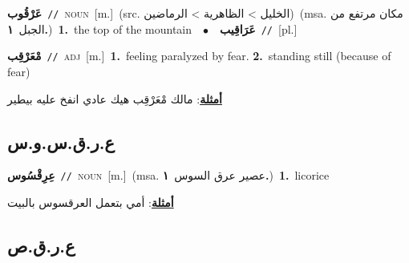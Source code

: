 \documentclass[10pt,a4paper,twoside]{article} %
\begin{document}
\begin{multicols}{2}
{\setlength\topsep{0pt}\textbf{\foreignlanguage{arabic}{عَرْقُوب}}\ {\color{gray}\texttt{//}\color{black}}\ \textsc{noun}\ [m.]\ (src. \color{gray}\foreignlanguage{arabic}{الخليل > الظاهرية > الرماضين}\color{black})\ \color{gray}(msa. \foreignlanguage{arabic}{مكان مرتفع من الجبل}~\foreignlanguage{arabic}{\textbf{١.}})\color{black}\ \textbf{1.}~the top of the mountain\ \ $\bullet$\ \ \setlength\topsep{0pt}\textbf{\foreignlanguage{arabic}{عَرَاقِيب}}\ {\color{gray}\texttt{//}\color{black}}\ [pl.]\ } \vspace{2mm}

{\setlength\topsep{0pt}\textbf{\foreignlanguage{arabic}{مْعَرْقِب}}\ {\color{gray}\texttt{//}\color{black}}\ \textsc{adj}\ [m.]\ \textbf{1.}~feeling paralyzed by fear.  \textbf{2.}~standing still (because of fear)\  \begin{flushright}\color{gray}\foreignlanguage{arabic}{\textbf{\underline{\foreignlanguage{arabic}{أمثلة}}}: مالك مْعَرْقِب هيك عادي انفخ عليه بيطير}\end{flushright}\color{black}} \vspace{2mm}

\vspace{-3mm}
\subsection*{\color{blue}\foreignlanguage{arabic}{ع.ر.ق.س.و.س}\color{blue}{ (ntws)}} 

{\setlength\topsep{0pt}\textbf{\foreignlanguage{arabic}{عِرِقْسُوس}}\ {\color{gray}\texttt{//}\color{black}}\ \textsc{noun}\ [m.]\ \color{gray}(msa. \foreignlanguage{arabic}{عصير عرق السوس}~\foreignlanguage{arabic}{\textbf{١.}})\color{black}\ \textbf{1.}~licorice\  \begin{flushright}\color{gray}\foreignlanguage{arabic}{\textbf{\underline{\foreignlanguage{arabic}{أمثلة}}}: أمي بتعمل العرقسوس بالبيت}\end{flushright}\color{black}} \vspace{2mm}

\vspace{-3mm}
\subsection*{\color{blue}\foreignlanguage{arabic}{ع.ر.ق.ص}\color{blue}{}} 


\end{multicols}
\end{document}
